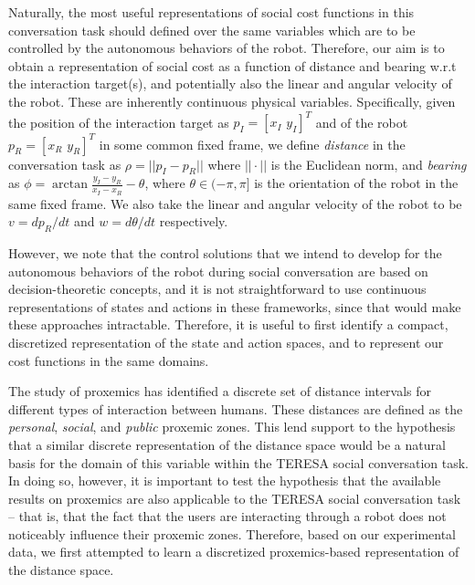 \documentclass[a4paper,11pt]{report}
\begin{document}
Naturally, the most useful representations of social cost functions in this conversation task should defined over the same variables which are to be controlled by the autonomous behaviors of the robot. Therefore, our aim is to obtain a representation of social cost as a function of distance and bearing w.r.t the interaction target(s), and potentially also the linear and angular velocity of the robot. These are inherently continuous physical variables. Specifically, given the position of the interaction target as $p_I = [x_I\,\,y_I]^T$ and of the robot $p_R = [x_R\,\,y_R]^T$ in some common fixed frame, we define \emph{distance} in the conversation task as $\rho = ||p_I - p_R||$ where $||\cdot||$ is the Euclidean norm, and \emph{bearing} as $\phi = \arctan \frac{y_I - y_R}{x_I - x_R} - \theta$, where $\theta\in(-\pi,\pi]$ is the orientation of the robot in the same fixed frame. We also take the linear and angular velocity of the robot to be $v = dp_R/dt$ and $w = d\theta/dt$ respectively.

However, we note that the control solutions that we intend to develop for the autonomous behaviors of the robot during social conversation are based on decision-theoretic concepts, and it is not straightforward to use continuous representations of states and actions in these frameworks, since that would make these approaches intractable. Therefore, it is useful to first identify a compact, discretized representation of the state and action spaces, and to represent our cost functions in the same domains.

The study of proxemics \cite{hall1966hidden} has identified a discrete set of distance intervals for different types of interaction between humans. These distances are defined as the \emph{personal}, \emph{social}, and \emph{public} proxemic zones. This lend support to the hypothesis that a similar discrete representation of the distance space would be a natural basis for the domain of this variable within the TERESA social conversation task. In doing so, however, it is important to test the hypothesis that the available results on proxemics are also applicable to the TERESA social conversation task -- that is, that the fact that the users are interacting through a robot does not noticeably influence their proxemic zones. Therefore, based on our experimental data, we first attempted to learn a discretized proxemics-based representation of the distance space.
\end{document}
